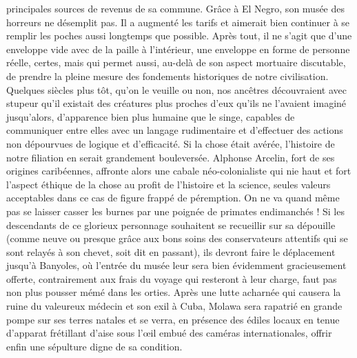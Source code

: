 principales sources de revenus de sa commune. Grâce à El Negro, son musée des horreurs ne désemplit pas. Il a augmenté les tarifs et aimerait bien continuer à se remplir les poches aussi longtemps que possible. Après tout, il ne s’agit que d’une enveloppe vide avec de la paille à l’intérieur, une enveloppe en forme de personne réelle, certes, mais qui permet aussi, au-delà de son aspect mortuaire discutable, de prendre la pleine mesure des fondements historiques de notre civilisation. Quelques siècles plus tôt, qu’on le veuille ou non, nos ancêtres découvraient avec stupeur qu’il existait des créatures plus proches d’eux qu’ils ne l’avaient imaginé jusqu’alors, d’apparence bien plus humaine que le singe, capables de communiquer entre elles avec un langage rudimentaire et d’effectuer des actions non dépourvues de logique et d’efficacité. Si la chose était avérée, l’histoire de notre filiation en serait grandement bouleversée. Alphonse Arcelin, fort de ses origines caribéennes, affronte alors une cabale néo-colonialiste qui nie haut et fort l’aspect éthique de la chose au profit de l’histoire et la science, seules valeurs acceptables dans ce cas de figure frappé de péremption. On ne va quand même pas se laisser casser les burnes par une poignée de primates endimanchés ! Si les descendants de ce glorieux personnage souhaitent se recueillir sur sa dépouille (comme neuve ou presque grâce aux bons soins des conservateurs attentifs qui se sont relayés à son chevet, soit dit en passant), ils devront faire le déplacement jusqu’à Banyoles, où l’entrée du musée leur sera bien évidemment gracieusement offerte, contrairement aux frais du voyage qui resteront à leur charge, faut pas non plus pousser mémé dans les orties. Après une lutte acharnée qui causera la ruine du valeureux médecin et son exil à Cuba, Molawa sera rapatrié en grande pompe sur ses terres natales et se verra, en présence des édiles locaux en tenue d’apparat frétillant d’aise sous l’œil embué des caméras internationales, offrir enfin une sépulture digne de sa condition.

